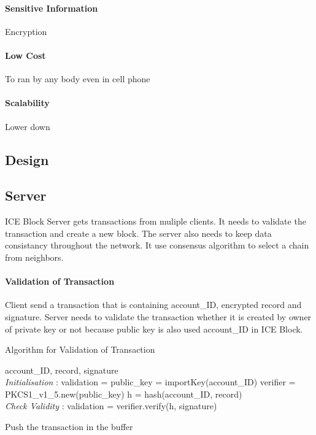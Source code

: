 \documentclass[conference]{IEEEtran}
\begin{document}
\paragraph{Sensitive Information}
Encryption

\paragraph{Low Cost}
To ran by any body even in cell phone

\paragraph{Scalability}
Lower down 


\subsection{Design}

\subsection{Server}
ICE Block Server gets transactions from muliple clients. It needs to validate the transaction and create a new block.
The server also needs to keep data consistancy throughout the network. It use consensus algorithm to select a chain from neighbors.


\paragraph{Validation of Transaction} 
Client send a transaction that is containing account\_ID, encrypted record and signature.
Server needs to validate the transaction whether it is created by owner of private key or not because public key is also used account\_ID in ICE Block.

\begin{algorithm}
    \caption{Algorithm for Validation of Transaction}
    \begin{algorithmic}[1]
        \renewcommand{\algorithmicrequire}{\textbf{Input:}}
        \renewcommand{\algorithmicensure}{\textbf{Output:}}
        \REQUIRE account\_ID, record, signature
        \\ \textit{Initialisation} :
        \STATE validation = \FALSE
        \STATE public\_key = importKey(account\_ID)
        \STATE verifier = PKCS1\_v1\_5.new(public\_key)
        \STATE h = hash(account\_ID, record)
        \\ \textit{Check Validity} :
        \STATE validation = verifier.verify(h, signature)

            \STATE Push the transaction in the buffer
        \ENDIF

    \end{algorithmic} 
\end{algorithm}
\end{document}

